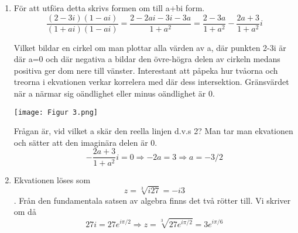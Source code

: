 \documentclass[a4paper,12pt]{article}
\begin{document}
\begin{enumerate}
          \item För att utföra detta skrivs formen om till a+bi form.
          $$\frac{(2-3i)(1-ai)}{(1+ai)(1-ai)}=\frac{2-2ai-3i-3a}{1+a^2}=\frac{2-3a}{1+a^2}-\frac{2a+3}{1+a^2}i$$

          Vilket bildar en cirkel om man plottar alla värden av a, där punkten
          2-3i är där a=0 och där negativa a bildar den övre-högra delen av cirkeln
          medans positiva ger dom nere till vänster.
          Interestant att påpeka hur tvåorna och treorna i ekvationen
          verkar korrelera med där dess intersektion. Gränsvärdet
          när a närmar sig oändlighet eller minus oändlighet är 0.
          \begin{center}
                \texttt{[image: Figur 3.png]}
          \end{center}

          Frågan är, vid vilket a skär den reella linjen d.v.s 2?
          Man tar man ekvationen och sätter att den imaginära delen är 0.
          $$-\frac{2a+3}{1+a^2}i=0\Rightarrow -2a=3\Rightarrow a=-3/2$$

          \item 
          Ekvationen löses som $$z=\sqrt[3]{i27}=-i3$$.
          Från den fundamentala satsen av algebra finns det två rötter till.
          Vi skriver om då 
          $$27i=27e^{i\pi/2}\Rightarrow z=\sqrt[3]{27e^{i\pi/2}}=3e^{i\pi/6}$$
\end{enumerate}
\end{document}
